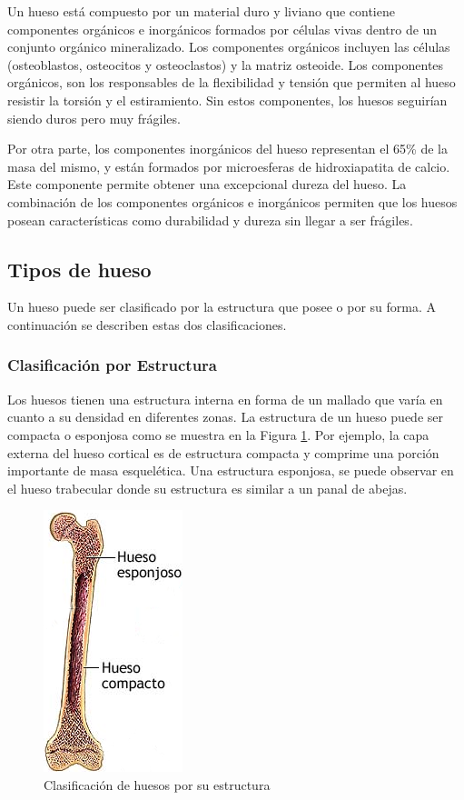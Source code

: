 Un hueso est\'a compuesto por un material duro y liviano que contiene componentes org\'anicos e inorg\'anicos formados por c\'elulas vivas dentro de un conjunto org\'anico mineralizado. Los componentes org\'anicos incluyen las c\'elulas (osteoblastos, osteocitos y osteoclastos) y la matriz osteoide. Los componentes org\'anicos, son los responsables de la flexibilidad y tensi\'on que permiten al hueso resistir la torsi\'on y el estiramiento. Sin estos componentes, los huesos seguir\'ian siendo duros pero muy fr\'agiles.

Por otra parte, los componentes inorg\'anicos del hueso representan el 65\% de la masa del mismo, y est\'an formados por microesferas de hidroxiapatita de calcio. Este componente permite obtener una excepcional dureza del hueso. La combinaci\'on de los componentes org\'anicos e inorg\'anicos permiten que los huesos posean caracter\'isticas como durabilidad y dureza sin llegar a ser fr\'agiles.

\subsection{Tipos de hueso}

Un hueso puede ser clasificado por la estructura que posee o por su forma. A continuaci\'on se describen estas dos clasificaciones.

\subsubsection*{Clasificaci\'on por Estructura}

Los huesos tienen una estructura interna en forma de un mallado que var\'ia en cuanto a su densidad en diferentes zonas. La estructura de un hueso puede ser compacta o esponjosa como se muestra en la Figura \ref{fig:esponjosocompacto}. Por ejemplo, la capa externa del hueso cortical es de estructura compacta y comprime una porci\'on importante de masa esquel\'etica. Una estructura esponjosa, se puede observar en el hueso trabecular donde su estructura es similar a un panal de abejas.
\begin{figure}[htb]
	\centering
		\includegraphics[width=0.20\columnwidth]{images/esponjosocompacto.png}
		\caption{Clasificaci\'on de huesos por su estructura}
	\label{fig:esponjosocompacto}
\end{figure}

